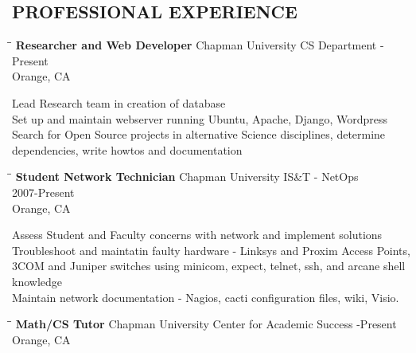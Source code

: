 \documentclass{res}
\begin{document}
\begin{resume}
\section{PROFESSIONAL EXPERIENCE}
   \vspace{-0.1in}	
   \begin{tabbing}
   \hspace{2.3in}\= \hspace{2.6in}\= \kill %
    {\bf Researcher and Web Developer} \>Chapman University CS Department     -Present\\
                             \>Orange, CA
   \end{tabbing}\vspace{-20pt}      %
	 Lead Research team in creation of database\\
	 Set up and maintain webserver running Ubuntu, Apache, Django, Wordpress\\
	 Search for Open Source projects in alternative Science disciplines, determine dependencies, write howtos and documentation\\
   \begin{tabbing}
   \hspace{2.3in}\= \hspace{2.6in}\= \kill %
    {\bf Student Network Technician} \>Chapman University IS\&T - NetOps\> ~~~~~~ 2007-Present\\
                          \>Orange, CA
   \end{tabbing}\vspace{-20pt}
	 Assess Student and Faculty concerns with network and implement solutions\\
	 Troubleshoot and maintatin faulty hardware - Linksys and Proxim Access Points, 3COM and Juniper switches using minicom, expect, telnet, ssh, and arcane shell knowledge\\
	 Maintain network documentation - Nagios, cacti configuration files, wiki, Visio.\\
   \begin{tabbing}%
   \hspace{2.3in}\= \hspace{2.6in}\= \kill %
   {\bf Math/CS Tutor}  \>Chapman University Center for Academic Success -Present\\
                          \>Orange, CA
   \end{tabbing}\vspace{-20pt}

\end{resume}
\end{document}
